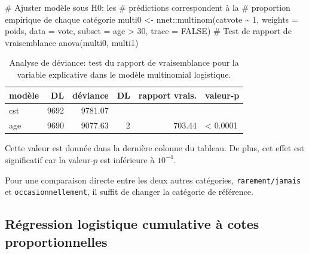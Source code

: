\documentclass[
  11pt,
  letterpaper,
]{scrbook}
\newenvironment{Shaded}{\begin{snugshade}}{\end{snugshade}}
\newcommand{\AttributeTok}[1]{\textcolor[rgb]{0.40,0.45,0.13}{#1}}
\newcommand{\CommentTok}[1]{\textcolor[rgb]{0.37,0.37,0.37}{#1}}
\newcommand{\ConstantTok}[1]{\textcolor[rgb]{0.56,0.35,0.01}{#1}}
\newcommand{\DecValTok}[1]{\textcolor[rgb]{0.68,0.00,0.00}{#1}}
\newcommand{\FunctionTok}[1]{\textcolor[rgb]{0.28,0.35,0.67}{#1}}
\newcommand{\NormalTok}[1]{\textcolor[rgb]{0.00,0.23,0.31}{#1}}
\newcommand{\OtherTok}[1]{\textcolor[rgb]{0.00,0.23,0.31}{#1}}
\newcommand{\SpecialCharTok}[1]{\textcolor[rgb]{0.37,0.37,0.37}{#1}}
\theoremstyle{definition}
\theoremstyle{remark}
\begin{document}
\begin{Shaded}
\begin{Highlighting}[]
\CommentTok{\# Ajuster modèle sous H0: les}
\CommentTok{\# prédictions correspondent à la}
\CommentTok{\# proportion empirique de chaque catégorie}
\NormalTok{multi0 }\OtherTok{\textless{}{-}}\NormalTok{ nnet}\SpecialCharTok{::}\FunctionTok{multinom}\NormalTok{(catvote }\SpecialCharTok{\textasciitilde{}} \DecValTok{1}\NormalTok{,}
                         \AttributeTok{weights =}\NormalTok{ poids,}
                         \AttributeTok{data =}\NormalTok{ vote,}
                         \AttributeTok{subset =}\NormalTok{ age }\SpecialCharTok{\textgreater{}} \DecValTok{30}\NormalTok{,}
                         \AttributeTok{trace =} \ConstantTok{FALSE}\NormalTok{)}
\CommentTok{\# Test de rapport de vraisemblance}
\FunctionTok{anova}\NormalTok{(multi0, multi1)}
\end{Highlighting}
\end{Shaded}

\begin{longtable}[]{@{}lrrrrl@{}}

\caption{\label{tbl-anova-multinom}Analyse de déviance: test du rapport
de vraisemblance pour la variable explicative dans le modèle multinomial
logistique.}

\tabularnewline

\toprule\noalign{}
modèle & DL & déviance & DL & rapport vrais. & valeur-p \\
\midrule\noalign{}
\endhead
\bottomrule\noalign{}
\endlastfoot
cst & 9692 & 9781.07 & & & \\
age & 9690 & 9077.63 & 2 & 703.44 & \textless{} 0.0001 \\

\end{longtable}

Cette valeur est donnée dans la dernière colonne du tableau. De plus,
cet effet est significatif car la valeur-\(p\) est inférieure à
\(10^{-4}\).

Pour une comparaison directe entre les deux autres catégories,
\texttt{rarement/jamais} et \texttt{occasionnellement}, il suffit de
changer la catégorie de référence.

\subsection{Régression logistique cumulative à cotes
proportionnelles}\label{ruxe9gression-logistique-cumulative-uxe0-cotes-proportionnelles}
\end{document}
